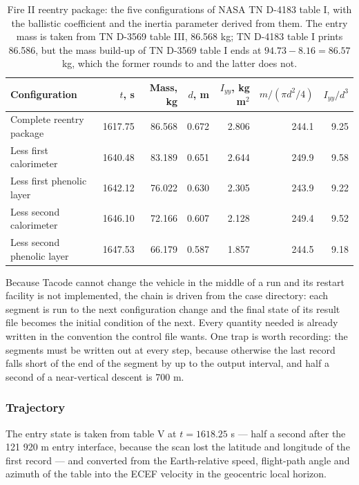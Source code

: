 \documentclass[11pt,a4paper]{article}
\begin{document}
\begin{table}[h]
\caption{Fire II reentry package: the five configurations of NASA TN D-4183 table I, with
the ballistic coefficient and the inertia parameter derived from them. The entry mass is
taken from TN D-3569 table III, 86.568 kg; TN D-4183 table I prints 86.586, but the
mass build-up of TN D-3569 table I ends at $94.73 - 8.16 = 86.57$ kg, which the former
rounds to and the latter does not.}
\label{fire2_mass}
\begin{center}
\begin{tabular}{l|r|r|r|r|r|r}
\hline \hline
Configuration & $t$, s & Mass, kg & $d$, m & $I_{yy}$, kg m$^2$ & $m/(\pi d^2/4)$ & $I_{yy}/d^3$ \\
\hline
Complete reentry package    & 1617.75 & 86.568 & 0.672 & 2.806 & 244.1 & 9.25 \\
Less first calorimeter      & 1640.48 & 83.189 & 0.651 & 2.644 & 249.9 & 9.58 \\
Less first phenolic layer   & 1642.12 & 76.022 & 0.630 & 2.305 & 243.9 & 9.22 \\
Less second calorimeter     & 1646.10 & 72.166 & 0.607 & 2.128 & 249.4 & 9.52 \\
Less second phenolic layer  & 1647.53 & 66.179 & 0.587 & 1.857 & 244.5 & 9.18 \\
\hline \hline
\end{tabular}
\end{center}
\end{table}

Because Tacode cannot change the vehicle in the middle of a run and its restart facility
is not implemented, the chain is driven from the case directory: each segment is run to
the next configuration change and the final state of its result file becomes the initial
condition of the next. Every quantity needed is already written in the convention the
control file wants. One trap is worth recording: the segments must be written out at every
step, because otherwise the last record falls short of the end of the segment by up to the
output interval, and half a second of a near-vertical descent is 700 m.

\subsubsection{Trajectory}

The entry state is taken from table V at $t = 1618.25$ s --- half a second after the
121 920 m entry interface, because the scan lost the latitude and longitude of the first
record --- and converted from the Earth-relative speed, flight-path angle and azimuth of
the table into the ECEF velocity in the geocentric local horizon.
\end{document}
